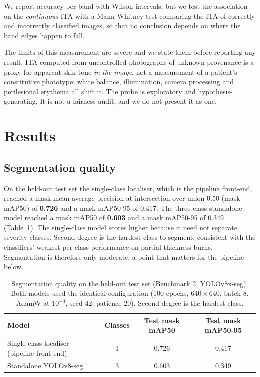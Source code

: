 \documentclass{melba}
\begin{document}
We report accuracy per band with Wilson intervals, but we test the association on the \emph{continuous} ITA with a Mann-Whitney test comparing the ITA of correctly and incorrectly classified images, so that no conclusion depends on where the band edges happen to fall.

The limits of this measurement are severe and we state them before reporting any result. ITA computed from uncontrolled photographs of unknown provenance is a proxy for apparent skin tone \emph{in the image}, not a measurement of a patient's constitutive phototype: white balance, illumination, camera processing and perilesional erythema all shift it. The probe is exploratory and hypothesis-generating. It is not a fairness audit, and we do not present it as one.

\section{Results}
\label{Res}
\subsection{Segmentation quality}
\label{Res:seg}
On the held-out test set the single-class localiser, which is the pipeline front-end, reached a mask mean average precision at intersection-over-union 0.50 (mask mAP50) of \textbf{0.726} and a mask mAP50-95 of 0.417. The three-class standalone model reached a mask mAP50 of \textbf{0.603} and a mask mAP50-95 of 0.349 (Table~\ref{tab:seg}). The single-class model scores higher because it need not separate severity classes. Second degree is the hardest class to segment, consistent with the classifiers' weakest per-class performance on partial-thickness burns. Segmentation is therefore only moderate, a point that matters for the pipeline below.

\begin{table}[t]
\centering
\caption{Segmentation quality on the held-out test set (Benchmark 2, YOLOv8x-seg). Both models used the identical configuration (100 epochs, $640\times640$, batch 8, AdamW at $10^{-3}$, seed 42, patience 20). Second degree is the hardest class.}
\small
\begin{tabular}{|l|c|c|c|}
\hline
Model & Classes & Test mask mAP50 & Test mask mAP50-95 \\
\hline
Single-class localiser (pipeline front-end) & 1 & 0.726 & 0.417 \\
Standalone YOLOv8-seg & 3 & 0.603 & 0.349 \\
\hline
\end{tabular}
\label{tab:seg}
\end{table}
\end{document}
